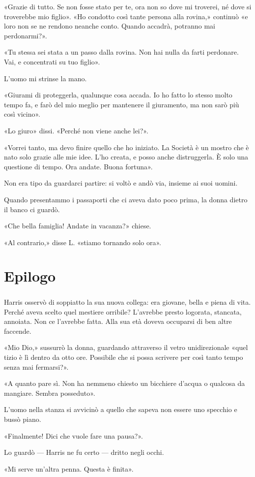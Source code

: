 \documentclass[a4paper,12pt]{book}
\begin{document}
«Grazie di tutto. Se non fosse stato per te, ora non so dove mi troverei, né
dove si troverebbe mio figlio». «Ho condotto così tante persona alla rovina,»
continuò «e loro non se ne rendono neanche conto. Quando accadrà, potranno mai
perdonarmi?».

«Tu stessa sei stata a un passo dalla rovina. Non hai nulla da farti perdonare.
Vai, e concentrati su tuo figlio».

L'uomo mi strinse la mano.

«Giurami di proteggerla, qualunque cosa accada. Io ho fatto lo stesso molto
tempo fa, e farò del mio meglio per mantenere il giuramento, ma non sarò più
così vicino».

«Lo giuro» dissi. «Perché non viene anche lei?».

«Vorrei tanto, ma devo finire quello che ho iniziato. La Società è un mostro che
è nato solo grazie alle mie idee. L'ho creata, e posso anche distruggerla. È
solo una questione di tempo. Ora andate. Buona fortuna».

Non era tipo da guardarci partire: si voltò e andò via, insieme ai suoi uomini.

Quando presentammo i passaporti che ci aveva dato poco prima, la donna dietro
il banco ci guardò.

«Che bella famiglia! Andate in vacanza?» chiese.

«Al contrario,» disse L. «stiamo tornando solo ora».

\backmatter

\chapter{Epilogo}

\paragraph{}
Harris osservò di soppiatto la sua nuova collega: era giovane, bella e piena
di vita. Perché aveva scelto quel mestiere orribile? L'avrebbe presto logorata,
stancata, annoiata. Non ce l'avrebbe fatta. Alla sua età doveva occuparsi di ben
altre faccende.

«Mio Dio,» sussurrò la donna, guardando attraverso il vetro unidirezionale «quel
tizio è lì dentro da otto ore. Possibile che si possa scrivere per così tanto
tempo senza mai fermarsi?».

«A quanto pare sì. Non ha nemmeno chiesto un bicchiere d'acqua o qualcosa da
mangiare. Sembra posseduto».

L'uomo nella stanza si avvicinò a quello che sapeva non essere uno specchio e
bussò piano.

«Finalmente! Dici che vuole fare una pausa?».

Lo guardò --- Harris ne fu certo --- dritto negli occhi.

«Mi serve un'altra penna. Questa è finita».

\tableofcontents
\end{document}
